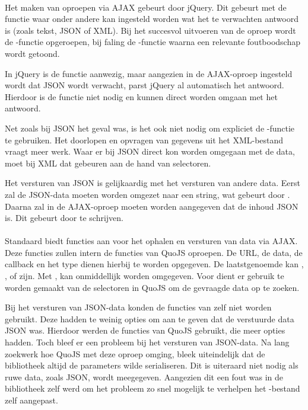 \paragraph{\jqm}
Het maken van oproepen via AJAX gebeurt door jQuery. 
Dit gebeurt met de functie  waar onder andere kan ingesteld worden wat het te verwachten antwoord is (zoals tekst, JSON of XML). 
Bij het succesvol uitvoeren van de oproep wordt de -functie opgeroepen, bij faling de -functie waarna een relevante foutboodschap wordt getoond.

In jQuery is de functie  aanwezig, maar aangezien in de AJAX-oproep ingesteld wordt dat JSON wordt verwacht, parst jQuery al automatisch het antwoord. 
Hierdoor is de functie  niet nodig en kunnen direct worden omgaan met het antwoord.

Net zoals bij JSON het geval was, is het ook niet nodig om expliciet de -functie te gebruiken. 
Het doorlopen en opvragen van gegevens uit het XML-bestand vraagt meer werk. 
Waar er bij JSON direct kon worden omgegaan met de data, moet bij XML dat gebeuren aan de hand van selectoren.

Het versturen van JSON is gelijkaardig met het versturen van andere data.
Eerst zal de JSON-data moeten worden omgezet naar een string, wat gebeurt door .
Daarna zal in de AJAX-oproep moeten worden aangegeven  dat de inhoud JSON is.
Dit gebeurt door  te schrijven.

\paragraph{\lungo}
Standaard biedt \lungo{} functies aan voor het ophalen en versturen van data via AJAX.
Deze functies zullen intern de functies van QuoJS oproepen.
De URL, de data, de callback en het type dienen hierbij te worden opgegeven.
De laatstgenoemde kan , ,  of  zijn.
Met ,  kan onmiddellijk worden omgegeven.
Voor  dient er gebruik te worden gemaakt van de selectoren in QuoJS om de gevraagde data op te zoeken.

Bij het versturen van JSON-data konden de functies van \lungo{} zelf niet worden gebruikt.
Deze hadden te weinig opties om aan te geven dat de verstuurde data JSON was.
Hierdoor werden de functies van QuoJS gebruikt, die meer opties hadden.
Toch bleef er een probleem bij het versturen van JSON-data.
Na lang zoekwerk hoe QuoJS met deze oproep omging, bleek uiteindelijk dat de bibliotheek altijd de parameters wilde serialiseren.
Dit is uiteraard niet nodig als ruwe data, zoals JSON, wordt meegegeven.
Aangezien dit een fout was in de bibliotheek zelf werd om het probleem zo snel mogelijk te verhelpen het \js-bestand zelf aangepast.

